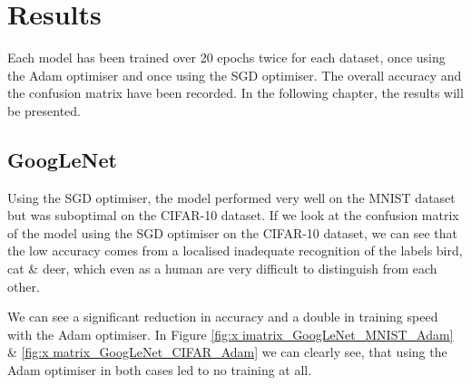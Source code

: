 \documentclass[conference]{IEEEtran}
\begin{document}
\section{Results}\label{C4}
Each model has been trained over 20 epochs twice for each dataset, once using the Adam optimiser and once using the SGD optimiser. 
The overall accuracy and the confusion matrix have been recorded. 
In the following chapter, the results will be presented.

\subsection{GoogLeNet}

Using the SGD optimiser, the model performed very well on the MNIST dataset but was suboptimal on the CIFAR-10 dataset. 
If we look at the confusion matrix of the model using the SGD optimiser on the CIFAR-10 dataset, we can see that the low accuracy comes from a localised inadequate recognition of the labels bird, cat \& deer, which even as a human are very difficult to distinguish from each other.

We can see a significant reduction in accuracy and a double in training speed with the Adam optimiser.
In Figure \ref{fig:x imatrix_GoogLeNet_MNIST_Adam} \& \ref{fig:x matrix_GoogLeNet_CIFAR_Adam} we can clearly see, that using the Adam optimiser in both cases led to no training at all.
\end{document}
